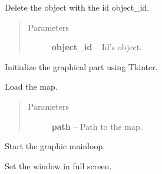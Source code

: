 \documentclass[letterpaper,10pt,english]{sphinxmanual}
\begin{document}
\begin{fulllineitems}

\begin{fulllineitems}
\label{api:graphic.GUI.delete}
Delete the object with the id object\_id.
\begin{quote}\begin{description}
\item[{Parameters}] \leavevmode
\textbf{object\_id} -- Id's object.

\end{description}\end{quote}

\end{fulllineitems}


\begin{fulllineitems}
\label{api:graphic.GUI.init_graphic}
Initialize the graphical part using Tkinter.

\end{fulllineitems}


\begin{fulllineitems}
\label{api:graphic.GUI.load_map}
Load the map.
\begin{quote}\begin{description}
\item[{Parameters}] \leavevmode
\textbf{path} -- Path to the map.

\end{description}\end{quote}

\end{fulllineitems}


\begin{fulllineitems}
\label{api:graphic.GUI.mainloop}
Start the graphic mainloop.

\end{fulllineitems}


\begin{fulllineitems}
\label{api:graphic.GUI.set_full_screen}
Set the window in full screen.

\end{fulllineitems}


\end{fulllineitems}
\end{document}
